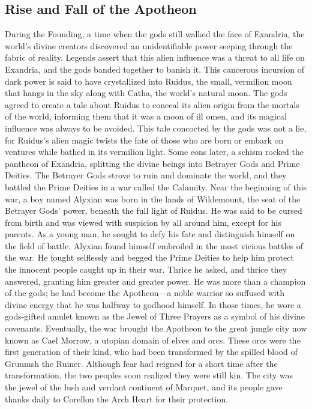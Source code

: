 \documentclass[10pt,a4,twoside,twocolumn,openany,nodeprecatedcode]{dndbook}
\begin{document}
\subsection{Rise and Fall of the Apotheon}
During the Founding, a time when the gods still walked the face of Exandria, the world's divine creators discovered an unidentifiable power seeping through the fabric of reality. Legends assert that this alien influence was a threat to all life on Exandria, and the gods banded together to banish it.
This cancerous incursion of dark power is said to have crystallized into Ruidus, the small, vermilion moon that hangs in the sky along with Catha, the world's natural moon. The gods agreed to create a tale about Ruidus to conceal its alien origin from the mortals of the world, informing them that it was a moon of ill omen, and its magical influence was always to be avoided. This tale concocted by the gods was not a lie, for Ruidus's alien magic twists the fate of those who are born or embark on ventures while bathed in its vermilion light.
Some eons later, a schism rocked the pantheon of Exandria, splitting the divine beings into Betrayer Gods and Prime Deities. The Betrayer Gods strove to ruin and dominate the world, and they battled the Prime Deities in a war called the Calamity.
Near the beginning of this war, a boy named Alyxian was born in the lands of Wildemount, the seat of the Betrayer Gods' power, beneath the full light of Ruidus. He was said to be cursed from birth and was viewed with suspicion by all around him, except for his parents. As a young man, he sought to defy his fate and distinguish himself on the field of battle. Alyxian found himself embroiled in the most vicious battles of the war. He fought selflessly and begged the Prime Deities to help him protect the innocent people caught up in their war. Thrice he asked, and thrice they answered, granting him greater and greater power. He was more than a champion of the gods; he had become the Apotheon—a noble warrior so suffused with divine energy that he was halfway to godhood himself. In those times, he wore a gods-gifted amulet known as the Jewel of Three Prayers as a symbol of his divine covenants.
Eventually, the war brought the Apotheon to the great jungle city now known as Cael Morrow, a utopian domain of elves and orcs. These orcs were the first generation of their kind, who had been transformed by the spilled blood of Gruumsh the Ruiner. Although fear had reigned for a short time after the transformation, the two peoples soon realized they were still kin. The city was the jewel of the lush and verdant continent of Marquet, and its people gave thanks daily to Corellon the Arch Heart for their protection.
\end{document}
